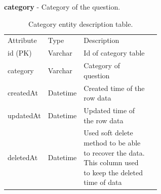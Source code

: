 \documentclass[12pt,oneside,openright,a4paper]{cpe-english-project}
\begin{document}
\textbf{category} - Category of the question.
\begin{table}[ht]
	\caption{Category entity description table.}
	\label{tab:Category entity description table.}
\begin{adjustbox}{width=\textwidth}
\begin{tabular}{llp{0.6\linewidth}l}
\rowcolor[HTML]{5B9BD5} 
Attribute & Type     & Description                                                                                                 \\
\rowcolor[HTML]{DEEAF6} 
id (PK)   & Varchar  & Id of category table                                                                                        \\
category  & Varchar  & Category of question                                                                                        \\
\rowcolor[HTML]{DEEAF6} 
createdAt & Datetime & Created time of the row data                                                                                \\
updatedAt & Datetime & Updated time of the row   data                                                                              \\
\rowcolor[HTML]{DEEAF6} 
deletedAt & Datetime & Used soft delete method to be able to recover the data. This column   used to keep the deleted time of data
\end{tabular}
\end{adjustbox}
\end{table}

\pagebreak
\end{document}
